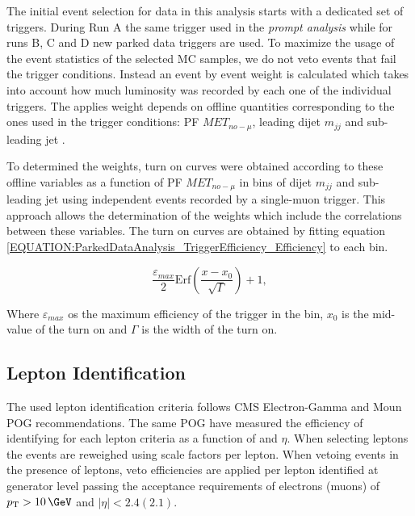The initial event selection for data in this analysis starts with a dedicated set of triggers. During Run A the same trigger used in the \textit{prompt analysis} while for runs B, C and D new parked data triggers are used. To maximize the usage of the event statistics of the selected \gls{MC} samples, we do not veto events that fail the trigger conditions. Instead an event by event weight is calculated which takes into account how much luminosity was recorded by each one of the individual triggers. The applies weight depends on offline quantities corresponding to the ones used in the trigger conditions: \gls{PF} $MET_{no-\mu}$, leading dijet $m_{jj}$ and sub-leading jet \pt. 

To determined the weights, turn on curves were obtained according to these offline variables as a function of \gls{PF} $MET_{no-\mu}$ in bins of dijet $m_{jj}$ and sub-leading jet \pt using independent events recorded by a single-muon trigger. This approach allows the determination of the weights which include the correlations between these variables. The turn on curves are obtained by fitting equation \ref{EQUATION:ParkedDataAnalysis_TriggerEfficiency_Efficiency} to each bin.

\begin{equation}
\frac{\varepsilon_{max}}{2}\text{Erf}\left(\frac{x-x_{0}}{\sqrt{\Gamma}}\right)+1,
\label{EQUATION:ParkedDataAnalysis_TriggerEfficiency_Efficiency} 
\end{equation}

Where $\varepsilon_{max}$ os the maximum efficiency of the trigger in the bin, $x_{0}$ is the mid-value of the turn on and $\Gamma$ is the width of the turn on.

\subsection{Lepton Identification}


The used lepton identification criteria follows \gls{CMS} Electron-Gamma and Moun \gls{POG} recommendations. The same \gls{POG} have measured the efficiency of identifying for each lepton criteria as a function of \pt and $\eta$. When selecting leptons the events are reweighed using scale factors per lepton. When vetoing events in the presence of leptons, veto efficiencies are applied per lepton identified at generator level passing the acceptance requirements of electrons (muons) of $\pt>10\,\GeV$ and $|\eta|<2.4(2.1)$.

